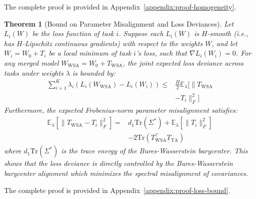 \documentclass{article}
\theoremstyle{plain}
\newtheorem{theorem}{Theorem}[section]
\theoremstyle{definition}
\theoremstyle{remark}
\begin{document}
The complete proof is provided in Appendix~\ref{appendix:proof-homogeneity}.

\begin{theorem}[Bound on Parameter Misalignment and Loss Deviances]
Let $L_i(W)$ be the loss function of task $i$. Suppose each $L_i(W)$ is $H$-smooth (i.e., has $H$-Lipschitz continuous gradients) with respect to the weights $W$, and let $W_i = W_0 + T_i$ be a local minimum of task $i$'s loss, such that $\nabla L_i(W_i) = 0$. For any merged model $W_{\text{WSA}} = W_0 + T_{\text{WSA}}$, the joint expected loss deviance across tasks under weights $\lambda$ is bounded by:
\begin{equation}
  \begin{split}
    \sum_{i=1}^K \lambda_i \left( L_i(W_{\text{WSA}}) - L_i(W_i) \right) \leq {} & \frac{H}{2} \mathbb{E}_{\lambda} \Big[ \| T_{\text{WSA}} \\
    & - T_i \|_F^2 \Big]
  \end{split}
\end{equation}
Furthermore, the expected Frobenius-norm parameter misalignment satisfies:
\begin{equation}
  \begin{split}
    \mathbb{E}_{\lambda} \left[ \| T_{\text{WSA}} - T_i \|_F^2 \right] = {} & d_1 \text{Tr}(\Sigma^*) + \mathbb{E}_{\lambda} \left[ \| T_i \|_F^2 \right] \\
    & - 2 \text{Tr} \left( T_{\text{WSA}}^\top T_{\text{TA}} \right)
  \end{split}
\end{equation}
where $d_1 \text{Tr}(\Sigma^*)$ is the trace energy of the Bures-Wasserstein barycenter. This shows that the loss deviance is directly controlled by the Bures-Wasserstein barycenter alignment which minimizes the spectral misalignment of covariances.
\end{theorem}

The complete proof is provided in Appendix~\ref{appendix:proof-loss-bound}.
\end{document}
